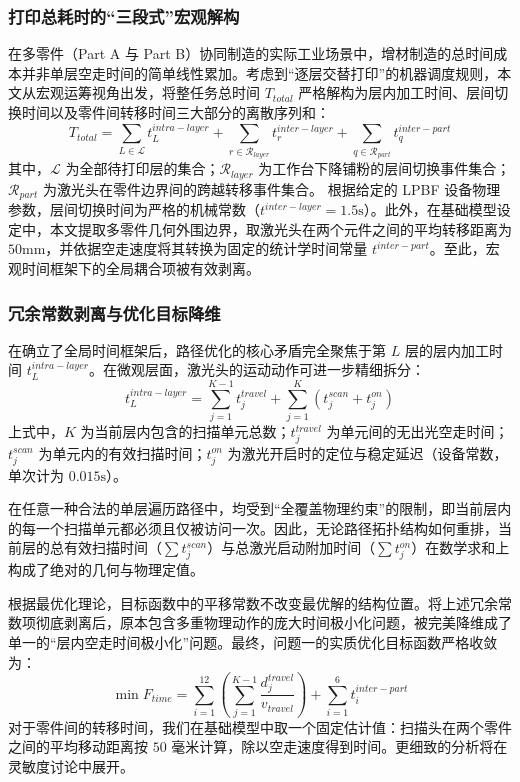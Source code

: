 \documentclass[a4paper, 12pt]{ctexart}
\begin{document}
\subsubsection{打印总耗时的“三段式”宏观解构}
在多零件（Part A 与 Part B）协同制造的实际工业场景中，增材制造的总时间成本并非单层空走时间的简单线性累加。考虑到“逐层交替打印”的机器调度规则，本文从宏观运筹视角出发，将整任务总时间 $T_{total}$ 严格解构为层内加工时间、层间切换时间以及零件间转移时间三大部分的离散序列和：
\begin{equation}
    T_{total} = \sum_{L \in \mathcal{L}} t_L^{intra-layer} + \sum_{r \in \mathcal{R}_{layer}} t_r^{inter-layer} + \sum_{q \in \mathcal{R}_{part}} t_q^{inter-part}
\end{equation}
其中，$\mathcal{L}$ 为全部待打印层的集合；$\mathcal{R}_{layer}$ 为工作台下降铺粉的层间切换事件集合；$\mathcal{R}_{part}$ 为激光头在零件边界间的跨越转移事件集合。
根据给定的 LPBF 设备物理参数，层间切换时间为严格的机械常数（$t^{inter-layer} = 1.5\text{s}$）。此外，在基础模型设定中，本文提取多零件几何外围边界，取激光头在两个元件之间的平均转移距离为 $50\text{mm}$，并依据空走速度将其转换为固定的统计学时间常量 $t^{inter-part}$。至此，宏观时间框架下的全局耦合项被有效剥离。

\subsubsection{冗余常数剥离与优化目标降维}
在确立了全局时间框架后，路径优化的核心矛盾完全聚焦于第 $L$ 层的层内加工时间 $t_L^{intra-layer}$。在微观层面，激光头的运动动作可进一步精细拆分：
\begin{equation}
    t_L^{intra-layer} = \sum_{j=1}^{K-1} t^{travel}_j + \sum_{j=1}^{K} (t^{scan}_j + t^{on}_j)
\end{equation}
上式中，$K$ 为当前层内包含的扫描单元总数；$t^{travel}_j$ 为单元间的无出光空走时间；$t^{scan}_j$ 为单元内的有效扫描时间；$t^{on}_j$ 为激光开启时的定位与稳定延迟（设备常数，单次计为 $0.015\text{s}$）。

在任意一种合法的单层遍历路径中，均受到“全覆盖物理约束”的限制，即当前层内的每一个扫描单元都必须且仅被访问一次。因此，无论路径拓扑结构如何重排，当前层的总有效扫描时间（$\sum t^{scan}_j$）与总激光启动附加时间（$\sum t^{on}_j$）在数学求和上构成了绝对的几何与物理定值。

根据最优化理论，目标函数中的平移常数不改变最优解的结构位置。将上述冗余常数项彻底剥离后，原本包含多重物理动作的庞大时间极小化问题，被完美降维成了单一的“层内空走时间极小化”问题。最终，问题一的实质优化目标函数严格收敛为：
\begin{equation}
    \min F_{time} = \sum_{i=1}^{12} \left( \sum_{j=1}^{K-1} \frac{d^{travel}_j}{v_{travel}} \right) + \sum_{i=1}^{6} t^{inter-part}_i
\end{equation}
对于零件间的转移时间，我们在基础模型中取一个固定估计值：扫描头在两个零件之间的平均移动距离按 $50$ 毫米计算，除以空走速度得到时间。更细致的分析将在灵敏度讨论中展开。
\end{document}
